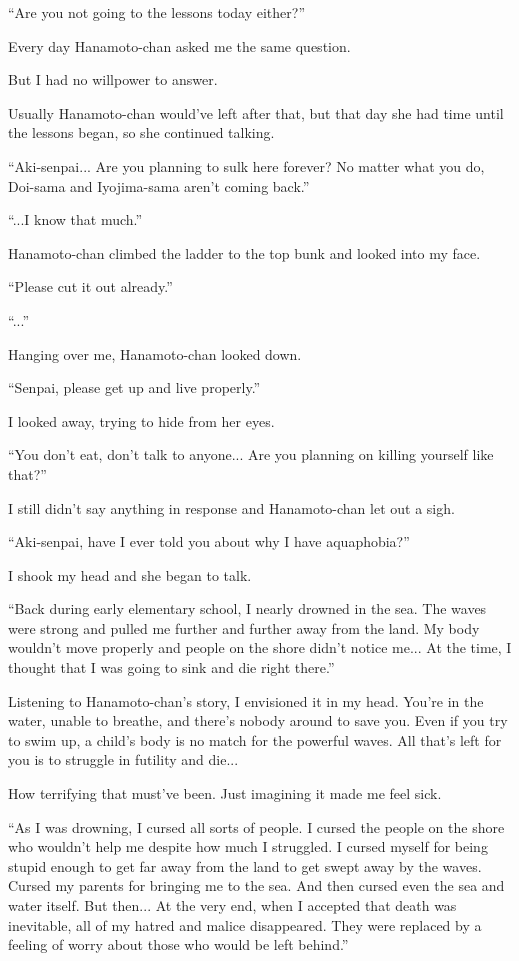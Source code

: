 ``Are you not going to the lessons today either?''

Every day Hanamoto-chan asked me the same question.

But I had no willpower to answer.

Usually Hanamoto-chan would've left after that, but that day she had time until the lessons began, so she continued talking.

``Aki-senpai... Are you planning to sulk here forever? No matter what you do, Doi-sama and Iyojima-sama aren't coming back.''

``...I know that much.''

Hanamoto-chan climbed the ladder to the top bunk and looked into my face.

``Please cut it out already.''

``...''

Hanging over me, Hanamoto-chan looked down.

``Senpai, please get up and live properly.''

I looked away, trying to hide from her eyes.

``You don't eat, don't talk to anyone... Are you planning on killing yourself like that?''

I still didn't say anything in response and Hanamoto-chan let out a sigh.

``Aki-senpai, have I ever told you about why I have aquaphobia?''

I shook my head and she began to talk.

``Back during early elementary school, I nearly drowned in the sea. The waves were strong and pulled me further and further away from the land. My body wouldn't move properly and people on the shore didn't notice me... At the time, I thought that I was going to sink and die right there.''

Listening to Hanamoto-chan's story, I envisioned it in my head. You're in the water, unable to breathe, and there's nobody around to save you. Even if you try to swim up, a child's body is no match for the powerful waves. All that's left for you is to struggle in futility and die...

How terrifying that must've been. Just imagining it made me feel sick.

``As I was drowning, I cursed all sorts of people. I cursed the people on the shore who wouldn't help me despite how much I struggled. I cursed myself for being stupid enough to get far away from the land to get swept away by the waves. Cursed my parents for bringing me to the sea. And then cursed even the sea and water itself. But then... At the very end, when I accepted that death was inevitable, all of my hatred and malice disappeared. They were replaced by a feeling of worry about those who would be left behind.''

